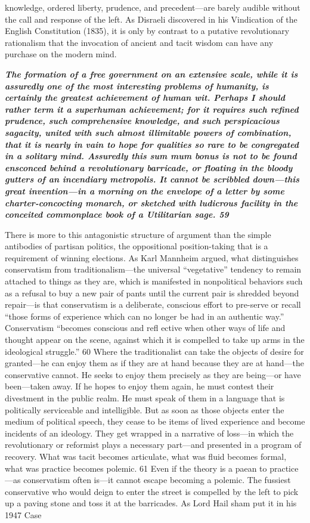 knowledge, ordered liberty, prudence, and precedent—are barely audible without the call and response of the left. As Disraeli discovered in his Vindication of the English Constitution (1835), it is only by contrast to a putative revolutionary rationalism that the invocation of ancient and tacit wisdom can have any purchase on the modern mind.{\par} {\textbf{\textit{The formation of a free government on an extensive scale, while it is assuredly one of the most interesting problems of humanity, is certainly the greatest achievement of human wit. Perhaps I should rather term it a superhuman achievement; for it requires such refined prudence, such comprehensive knowledge, and such perspicacious sagacity, united with such almost illimitable powers of combination, that it is nearly in vain to hope for qualities so rare to be congregated in a solitary mind. Assuredly this sum mum bonus is not to be found ensconced behind a revolutionary barricade, or floating in the bloody gutters of an incendiary metropolis. It cannot be scribbled down—this great invention—in a morning on the envelope of a letter by some charter-concocting monarch, or sketched with ludicrous facility in the conceited commonplace book of a Utilitarian sage. {\color{blue} 59 } } } }{\par} There is more to this antagonistic structure of argument than the simple antibodies of partisan politics, the oppositional position-taking that is a requirement of winning elections. As Karl Mannheim argued, what distinguishes conservatism from traditionalism—the universal “vegetative” tendency to remain attached to things as they are, which is manifested in nonpolitical behaviors such as a refusal to buy a new pair of pants until the current pair is shredded beyond repair—is that conservatism is a deliberate, conscious effort to pre-serve or recall “those forms of experience which can no longer be had in an authentic way.” Conservatism “becomes conscious and refl ective when other ways of life and thought appear on the scene, against which it is compelled to take up arms in the ideological struggle.” {\color{blue} 60 } Where the traditionalist can take the objects of desire for granted—he can enjoy them as if they are at hand because they are at hand—the conservative cannot. He seeks to enjoy them precisely as they are being—or have been—taken away. If he hopes to enjoy them again, he must contest their divestment in the public realm. He must speak of them in a language that is politically serviceable and intelligible. But as soon as those objects enter the medium of political speech, they cease to be items of lived experience and become incidents of an ideology. They get wrapped in a narrative of loss—in which the revolutionary or reformist plays a necessary part—and presented in a program of recovery. What was tacit becomes articulate, what was fluid becomes formal, what was practice becomes polemic. {\color{blue} 61 } Even if the theory is a paean to practice—as conservatism often is—it cannot escape becoming a polemic. The fussiest conservative who would deign to enter the street is compelled by the left to pick up a paving stone and toss it at the barricades. As Lord Hail sham put it in his 1947 Case 